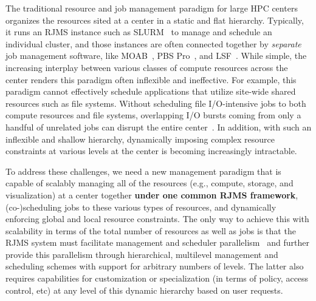 The traditional resource and job management paradigm
for large HPC centers organizes the resources sited
at a center in a static and flat hierarchy. Typically, it 
runs an RJMS instance such as SLURM~\cite{Jette02slurm}
to manage and schedule an individual cluster,
and those instances are often connected
together by {\em separate} job management software, 
like MOAB~\cite{MOAB}, PBS Pro~\cite{PSBPro}, and LSF~\cite{LSF}.
While simple, the increasing interplay 
between various classes of compute resources 
across the center renders this paradigm often
inflexible and ineffective. 
For example, this paradigm cannot effectively
schedule applications that utilize site-wide shared 
resources such as file systems. 
Without scheduling file I/O-intensive jobs 
to both compute resources and file systems, 
overlapping I/O bursts coming from only a handful of 
unrelated jobs can disrupt the entire center~\cite{SCR,SPINDLE}. 
In addition, with such an inflexible and shallow hierarchy, 
dynamically imposing complex 
resource constraints at various levels at the center
is becoming increasingly intractable. 

To address these challenges, we need 
a new management paradigm that is capable of scalably managing 
all of the resources (e.g., compute, storage, and visualization)
at a center together {\bf under one common RJMS framework},
(co-)scheduling jobs to these various types of resources, and 
dynamically enforcing global and local resource constraints. 
The only way to achieve this with scalability in terms of the total number 
of resources as well as jobs is that the RJMS system must
facilitate management and scheduler parallelism~\cite{Omega,Mesos}
and further provide this parallelism through hierarchical, multilevel 
management and scheduling schemes with support for arbitrary numbers of levels.
The latter also requires capabilities for customization or specialization (in terms
of policy, access control, etc) at any level of this dynamic hierarchy 
based on user requests.

